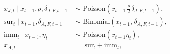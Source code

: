 \begin{equation}
  \begin{aligned}
    x_{J, t} \mid x_{t - 1}, \rho, \delta_{J, F, t - 1}
    \,\, &\sim \,\,
    \text{Poisson}\left(
      x_{t - 1}
      \, \frac{\rho}{2} \,
      \delta_{J, F, t - 1}
    \right), \\
    \text{sur}_{t} \mid x_{t - 1}, \delta_{A, F, t - 1}
    \,\, &\sim \,\,
    \text{Binomial}\left(
      x_{t - 1}, \,
      \delta_{A, F, t - 1}
    \right), \\
    \text{imm}_{t} \mid x_{t - 1}, \eta_{t}
    \,\, &\sim\,\,
    \text{Poisson}\left(
      x_{t - 1} \eta_{t}\right
    ), \\
    x_{A, t} &= \text{sur}_{t} + \text{imm}_{t},
    \end{aligned}
  \label{eqn:count-data-submodel}
\end{equation}